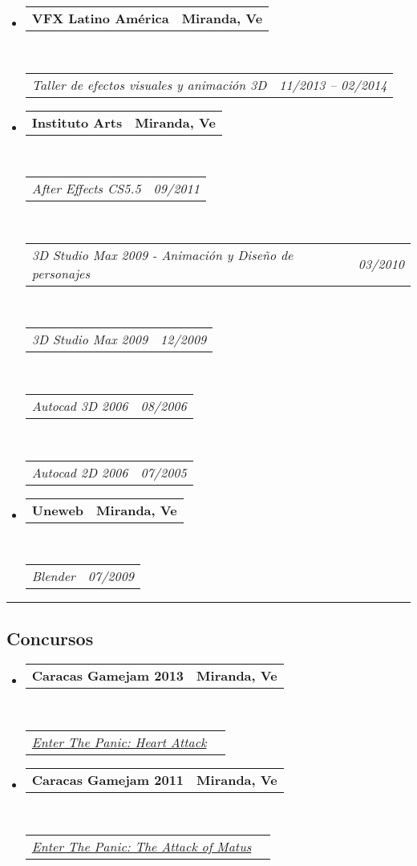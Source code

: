 \documentclass[10pt,letterpaper]{article}
\makeatletter
\newcommand{\headerrow}[2]
{\begin{tabular*}{\linewidth}{l@{\extracolsep{\fill}}r}
	#1 &
	#2 \\
\end{tabular*}}
\makeatother
\begin{document}
\begin{itemize}
	\parskip=0.1em

\item 
   \headerrow
   {\textbf{VFX Latino América}}
   {\textbf{Miranda, Ve}}
  \\
  \headerrow
   {\emph{Taller de efectos visuales y animación 3D}}
   {\emph{11/2013 -- 02/2014}}

\item 
   \headerrow
   {\textbf{Instituto Arts}}
   {\textbf{Miranda, Ve}}
	\\
	\headerrow
   {\emph{After Effects CS5.5}}
   {\emph{09/2011}}
	\\
	\headerrow
   {\emph{3D Studio Max 2009 - Animación y Diseño de personajes}}
   {\emph{03/2010}}
	\\
	\headerrow
   {\emph{3D Studio Max 2009}}
   {\emph{12/2009}}
	\\
	\headerrow
   {\emph{Autocad 3D 2006}}
   {\emph{08/2006}}
	\\
	\headerrow
   {\emph{Autocad 2D 2006}}
   {\emph{07/2005}}

\item 
   \headerrow
   {\textbf{Uneweb}}
   {\textbf{Miranda, Ve}}
	\\
	\headerrow
   {\emph{Blender}}
   {\emph{07/2009}}
\end{itemize}



\hrule
\vspace{-0.4em}
\subsection*{Concursos}

\begin{itemize}
	\parskip=0.1em
\item 
   \headerrow
   {\textbf{Caracas Gamejam 2013}}
   {\textbf{Miranda, Ve}}
	\\
	\headerrow
   {\emph{\href{http://globalgamejam.org/2013/enter-panic-heart-attack}{Enter The Panic: Heart Attack}}}{}
\item 
   \headerrow
   {\textbf{Caracas Gamejam 2011}}
   {\textbf{Miranda, Ve}}
	\\
	\headerrow
   {\emph{\href{http://archive.globalgamejam.org/2011/enter-panic-attack-matus}{Enter The Panic: The Attack of Matus}}}{}
\end{itemize}
\end{document}
